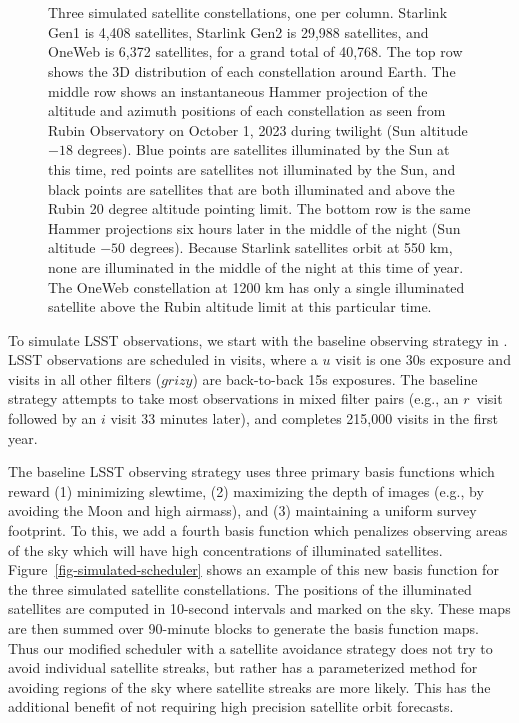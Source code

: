 \documentclass[twocolumn]{aastex631}
\begin{document}
\begin{figure*}[ht!]
\\
\\
\caption{Three simulated satellite constellations, one per column. Starlink Gen1 is 4,408 satellites, Starlink Gen2 is 29,988 satellites, and OneWeb is 6,372 satellites, for a grand total of 40,768. The top row shows the 3D distribution of each constellation around Earth. The middle row shows an instantaneous Hammer projection of the altitude and azimuth positions of each constellation as seen from Rubin Observatory on October 1, 2023 during twilight (Sun altitude $-18$ degrees). Blue points are satellites illuminated by the Sun at this time, red points are satellites not illuminated by the Sun, and black points are satellites that are both illuminated and above the Rubin 20 degree altitude pointing limit. The bottom row is the same Hammer projections six hours later in the middle of the night (Sun altitude $-50$ degrees). Because Starlink satellites orbit at 550 km, none are illuminated in the middle of the night at this time of year. The OneWeb constellation at 1200 km has only a single illuminated satellite above the Rubin altitude limit at this particular time.
\vspace{4em}
\label{fig-simulated-constellations}
}
\end{figure*}

To simulate LSST observations, we start with the baseline observing strategy in \citet{yoachim2022b}. LSST observations are scheduled in visits, where a $u$ visit is one 30s exposure and visits in all other filters ($grizy$) are back-to-back 15s exposures. The baseline strategy attempts to take most observations in mixed filter pairs (e.g., an $r$\ visit followed by an $i$ visit 33 minutes later), and completes 215,000 visits in the first year. 

The baseline LSST observing strategy uses three primary basis functions which reward (1) minimizing slewtime, (2) maximizing the depth of images (e.g., by avoiding the Moon and high airmass), and (3) maintaining a uniform survey footprint. To this, we add a fourth basis function which penalizes observing areas of the sky which will have high concentrations of illuminated satellites. Figure~\ref{fig-simulated-scheduler} shows an example of this new basis function for the three simulated satellite constellations. The positions of the illuminated satellites are computed in 10-second intervals and marked on the sky. These maps are then summed over 90-minute blocks to generate the basis function maps. Thus our modified scheduler with a satellite avoidance strategy does not try to avoid individual satellite streaks, but rather has a parameterized method for avoiding regions of the sky where satellite streaks are more likely. This has the additional benefit of not requiring high precision satellite orbit forecasts.
\end{document}
